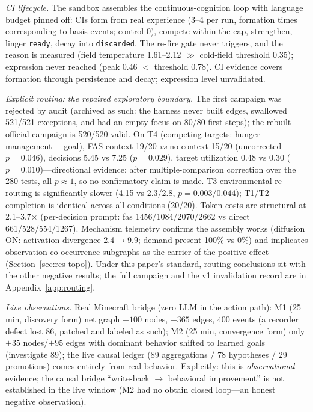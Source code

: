 \documentclass[10pt,a4paper]{article}
\begin{document}
\emph{CI lifecycle.} The sandbox assembles the continuous-cognition loop with language budget pinned off: CIs form from real experience (3--4 per run, formation times corresponding to basis events; control 0), compete within the cap, strengthen, linger \texttt{ready}, decay into \texttt{discarded}. The re-fire gate never triggers, and the reason is measured (field temperature 1.61--2.12 $\gg$ cold-field threshold 0.35); expression never reached (peak 0.46 $<$ threshold 0.78). CI evidence covers formation through persistence and decay; expression level unvalidated.

\emph{Explicit routing: the repaired exploratory boundary.} The first campaign was rejected by audit (archived as such: the harness never built edges, swallowed 521/521 exceptions, and had an empty focus on 80/80 first steps); the rebuilt official campaign is 520/520 valid. On T4 (competing targets: hunger management + goal), FAS context 19/20 \emph{vs} no-context 15/20 (uncorrected $p{=}0.046$), decisions 5.45 vs 7.25 ($p{=}0.029$), target utilization 0.48 vs 0.30 ($p{=}0.010$)---directional evidence; after multiple-comparison correction over the 280 tests, all $p{\approx}1$, so no confirmatory claim is made. T3 environmental re-routing is significantly slower (4.15 vs 2.3/2.8, $p{=}0.003$/$0.044$); T1/T2 completion is identical across all conditions (20/20). Token costs are structural at 2.1--3.7$\times$ (per-decision prompt: fas 1456/1084/2070/2662 vs direct 661/528/554/1267). Mechanism telemetry confirms the assembly works (diffusion ON: activation divergence 2.4$\rightarrow$9.9; demand present 100\% vs 0\%) and implicates observation-co-occurrence subgraphs as the carrier of the positive effect (Section~\ref{sec:res-topo}). Under this paper's standard, routing conclusions sit with the other negative results; the full campaign and the v1 invalidation record are in Appendix~\ref{app:routing}.

\emph{Live observations.} Real Minecraft bridge (zero LLM in the action path): M1 (25 min, discovery form) net graph $+100$ nodes, $+365$ edges, 400 events (a recorder defect lost 86, patched and labeled as such); M2 (25 min, convergence form) only $+35$ nodes/$+95$ edges with dominant behavior shifted to learned goals (investigate 89); the live causal ledger (89 aggregations / 78 hypotheses / 29 promotions) comes entirely from real behavior. Explicitly: this is \emph{observational} evidence; the causal bridge ``write-back $\rightarrow$ behavioral improvement'' is not established in the live window (M2 had no obtain closed loop---an honest negative observation).
\end{document}
